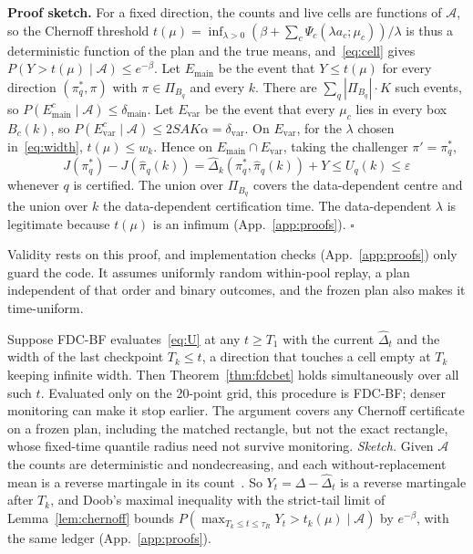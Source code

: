 \documentclass[sigconf,anonymous,review]{acmart}
\newcommand{\cA}{\mathcal{A}}
\newcommand{\eps}{\varepsilon}
\newcommand{\dmain}{\delta_{\text{main}}}
\newcommand{\dvar}{\delta_{\text{var}}}
\begin{document}
\textbf{Proof sketch.} For a fixed direction, the counts and live cells are functions of $\cA$, so the Chernoff threshold $t(\mu) = \inf_{\lambda>0}(\beta + \sum_c \Psi_c(\lambda a_c;\mu_c))/\lambda$ is thus a deterministic function of the plan and the true means, and~\eqref{eq:cell} gives $P(Y > t(\mu) \mid \cA) \le e^{-\beta}$. Let $E_{\text{main}}$ be the event that $Y \le t(\mu)$ for every direction $(\pi^*_q, \pi)$ with $\pi \in \Pi_{B_q}$ and every $k$. There are $\sum_q|\Pi_{B_q}|\cdot K$ such events, so $P(E_{\text{main}}^c \mid \cA) \le \dmain$. Let $E_{\text{var}}$ be the event that every $\mu_c$ lies in every box $B_c(k)$, so $P(E_{\text{var}}^c \mid \cA) \le 2SAK\alpha = \dvar$. On $E_{\text{var}}$, for the $\lambda$ chosen in~\eqref{eq:width}, $t(\mu) \le w_k$. Hence on $E_{\text{main}} \cap E_{\text{var}}$, taking the challenger $\pi' = \pi^*_q$,
\[
J(\pi^*_q) - J(\hat\pi_q(k)) = \hat\Delta_k(\pi^*_q, \hat\pi_q(k)) + Y \le U_q(k) \le \eps
\]
whenever $q$ is certified. The union over $\Pi_{B_q}$ covers the data-dependent centre and the union over $k$ the data-dependent certification time. The data-dependent $\lambda$ is legitimate because $t(\mu)$ is an infimum (App.~\ref{app:proofs}). $\square$

Validity rests on this proof, and implementation checks (App.~\ref{app:proofs}) only guard the code. It assumes uniformly random within-pool replay, a plan independent of that order and binary outcomes, and the frozen plan also makes it time-uniform.

\begin{remark}\label{rem:tu}
Suppose FDC-BF evaluates~\eqref{eq:U} at any $t \ge T_1$ with the current $\hat\Delta_t$ and the width of the last checkpoint $T_k \le t$, a direction that touches a cell empty at $T_k$ keeping infinite width. Then Theorem~\ref{thm:fdcbet} holds simultaneously over all such $t$. Evaluated only on the 20-point grid, this procedure is FDC-BF; denser monitoring can make it stop earlier. The argument covers any Chernoff certificate on a frozen plan, including the matched rectangle, but not the exact rectangle, whose fixed-time quantile radius need not survive monitoring. \emph{Sketch.} Given $\cA$ the counts are deterministic and nondecreasing, and each without-replacement mean is a reverse martingale in its count~\citep{serfling1974probability,bardenet2015concentration}. So $Y_t = \Delta - \hat\Delta_t$ is a reverse martingale after $T_k$, and Doob's maximal inequality with the strict-tail limit of Lemma~\ref{lem:chernoff} bounds $P(\max_{T_k \le t \le \tau_R} Y_t > t_k(\mu) \mid \cA)$ by $e^{-\beta}$, with the same ledger (App.~\ref{app:proofs}).
\end{remark}
\end{document}
